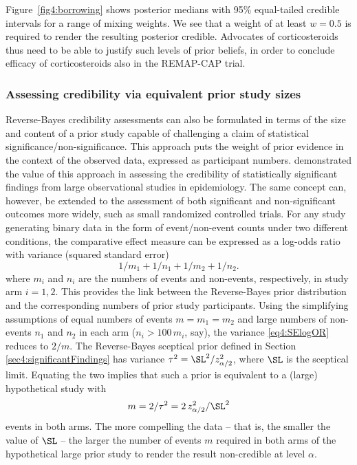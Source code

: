 Figure~\ref{fig4:borrowing} shows posterior medians with 95\% equal-tailed
credible intervals for a range of mixing weights. We see that a weight of at
least $w = 0.5$ is required to render the resulting posterior credible.
Advocates of corticosteroids thus need to be able to justify such levels of
prior beliefs, in order to conclude efficacy of corticosteroids also in the
REMAP-CAP trial.




\subsubsection{Assessing credibility via equivalent prior study sizes}
\label{sec4:prior-data-translation}
Reverse-Bayes credibility assessments can also be formulated in terms of the
size and content of a prior study capable of challenging a claim of statistical
significance/non-significance. This approach puts the weight of prior evidence
in the context of the observed data, expressed as participant numbers.
\citet{Greenland2006} demonstrated the value of this approach in assessing the
credibility of statistically significant findings from large observational
studies in epidemiology. The same concept can, however, be extended to the
assessment of both significant and non-significant outcomes more widely, such as
small randomized controlled trials. For any study generating binary data in the
form of event/non-event counts under two different conditions, the comparative
effect measure can be expressed as a log-odds ratio with variance (squared
standard error)
\begin{equation}
  \label{eq4:SElogOR}
1/m_1 + 1/n_1 + 1/m_2 + 1/n_2.
\end{equation}
where $m_i$ and $n_i$ are the numbers of events and non-events, respectively, in
study arm $i=1,2$. This provides the link between the Reverse-Bayes prior
distribution and the corresponding numbers of prior study participants. Using
the simplifying assumptions of equal numbers of events $m = m_{1} = m_{2}$ and
large numbers of non-events $n_{1}$ and $n_2$ in each arm ($n_i > 100 \, m_i$,
say), the variance \eqref{eq4:SElogOR} reduces to $2/m$. The Reverse-Bayes
sceptical prior defined in Section \ref{sec4:significantFindings} has variance
$\tau^{2} = \SL^2/z_{\alpha/2}^{2}$, where $\SL$ is the sceptical limit.
Equating the two implies that such a prior is equivalent to a (large)
hypothetical study with $$m = 2/\tau^{2} = 2 \, z_{\alpha/2}^2/\SL^2$$ events in
both arms. The more compelling the data -- that is, the smaller the value of
$\SL$ -- the larger the number of events $m$ required in both arms of the
hypothetical large prior study to render the result non-credible at level
$\alpha$.

